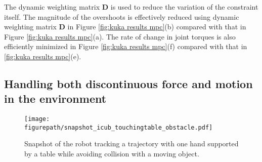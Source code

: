 The dynamic weighting matrix $\mathbf{D}$ is used to reduce the variation of the constraint itself. The magnitude of the overshoots is effectively reduced using dynamic weighting matrix $\mathbf{D}$ in Figure \ref{fig:kuka results mpc}(b) compared with that in Figure \ref{fig:kuka results mpc}(a). The rate of change in joint torques is also efficiently minimized in Figure \ref{fig:kuka results mpc}(f) compared with that in \ref{fig:kuka results mpc}(e).  




\subsection{Handling both discontinuous force and motion in the  environment}
\begin{figure}[!htb]
\centering
\texttt{[image: \\figurepath/snapshot\_icub\_touchingtable\_obstacle.pdf]}
\caption{Snapshot of the robot tracking a trajectory with one hand supported by a table while avoiding collision with a moving object.}
\label{fig:scenario of icub touchingtalbe obstacle}
\end{figure}

